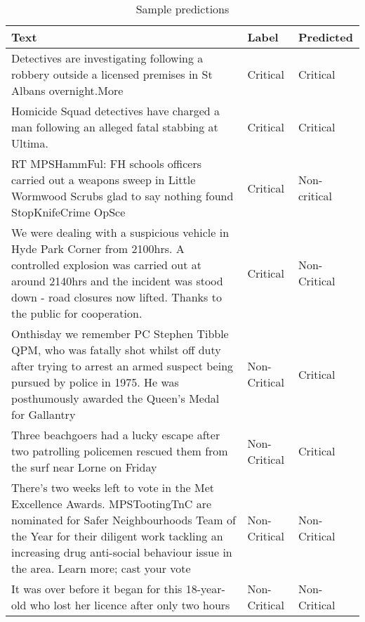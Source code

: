\begin{table}
\begin{center}
\caption{Sample predictions}
\label{tbl:sample_predictions}
\begin{tabular}{p{10cm}p{2cm}p{2cm}}
\toprule 
Text&Label&Predicted\\
\midrule 
Detectives are investigating following a robbery outside a licensed premises in St Albans overnight.More &Critical&Critical\\
\hline
Homicide Squad detectives have charged a man following an alleged fatal stabbing at Ultima.&Critical&Critical\\
\hline
RT MPSHammFul: FH schools officers carried out a weapons sweep in Little Wormwood Scrubs glad to say nothing found StopKnifeCrime OpSce&Critical&Non-critical\\
\hline
We were dealing with a suspicious vehicle in Hyde Park Corner from 2100hrs. A controlled explosion was carried out at around 2140hrs and the incident was stood down - road closures now lifted. Thanks to the public for cooperation.&Critical&Non-Critical\\
\hline
Onthisday we remember PC Stephen Tibble QPM, who was fatally shot whilst off duty after trying to arrest an armed suspect being pursued by police in 1975. He was posthumously awarded the Queen’s Medal for Gallantry&Non-Critical&Critical\\
\hline
Three beachgoers had a lucky escape after two patrolling policemen rescued them from the surf near Lorne on Friday&Non-Critical&Critical\\
\hline
There's two weeks left to vote in the Met Excellence Awards. MPSTootingTnC are nominated for Safer Neighbourhoods Team of the Year for their diligent work tackling an increasing drug anti-social behaviour issue in the area. Learn more; cast your vote&Non-Critical&Non-Critical\\
\hline
It was over before it began for this 18-year-old who lost her licence after only two hours&Non-Critical&Non-Critical\\
\hline

\bottomrule
\end{tabular}
\end{center}
\end{table}